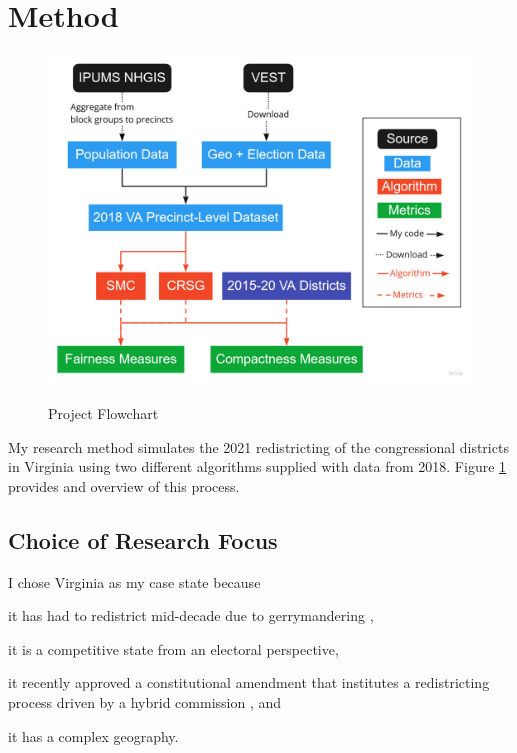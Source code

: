 \section{Method}
\label{sec:method}

\begin{figure}[H]
    \caption{Project Flowchart}
    \includegraphics[width=0.85\linewidth]{img/flowchart.pdf}
    \label{fig:flowchart}
    \raggedright
\end{figure}  

My research method simulates the 2021 redistricting of the congressional districts in Virginia using two different algorithms supplied with data from 2018. Figure \ref{fig:flowchart} provides and overview of this process.

\subsection{Choice of Research Focus}

I chose Virginia as my case state because 
\begin{seriate}
    \item it has had to redistrict mid-decade due to gerrymandering \parencite[see][]{2016a},
    \item it is a competitive state from an electoral perspective, 
    \item it recently approved a constitutional amendment that institutes a redistricting process driven by a hybrid commission \parencite{ballotpedia2020}, and
    \item it has a complex geography.
\end{seriate}

